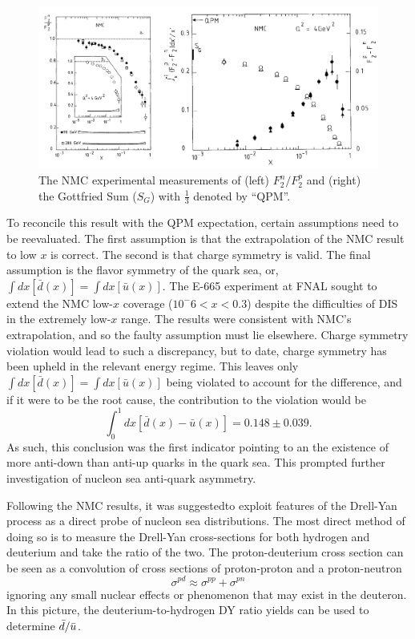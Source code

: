 \begin{figure}[h]
	\centering
	\includegraphics[width=\textwidth]{figures/background/NMC-All.pdf}
	\caption{The NMC experimental measurements of (left) $F_2^n/F_2^p$ and (right) the Gottfried Sum ($S_G$) with $\frac{1}{3}$ denoted by ``QPM''.}
	\label{fig:nmc}
\end{figure}

To reconcile this result with the QPM expectation, certain assumptions need to be reevaluated. The first assumption is that the extrapolation of the NMC result to low $x$ is correct. The second is that charge symmetry is valid. The final assumption is the flavor symmetry of the quark sea, or, $\int dx [\bar{d}(x)] = \int dx [\bar{u}(x)]$. The E-665 experiment at FNAL sought to extend the NMC low-$x$ coverage ($10^-6 < x < 0.3$) despite the difficulties of DIS in the extremely low-$x$ range. The results were consistent with NMC's extrapolation\CN, and so the faulty assumption must lie elsewhere. Charge symmetry violation would lead to such a discrepancy, but to date, charge symmetry has been upheld in the relevant energy regime\cite{Abegg:1998sg}. This leaves only $\int dx [\bar{d}(x)] = \int dx [\bar{u}(x)]$ being violated to account for the difference, and if it were to be the root cause, the contribution to the violation would be
\begin{equation}
\int_0^1 dx[\bar{d}(x) - \bar{u}(x)] = 0.148 \pm 0.039.
\end{equation}
As such, this conclusion was the first indicator pointing to an the existence of more anti-down than anti-up quarks in the quark sea. This prompted further investigation of nucleon sea anti-quark asymmetry.

Following the NMC results, it was suggested\CN to exploit features of the Drell-Yan process as a direct probe of nucleon sea distributions. The most direct method of doing so is to measure the Drell-Yan cross-sections for both hydrogen and deuterium and take the ratio of the two. The proton-deuterium cross section can be seen as a convolution of cross sections of proton-proton and a proton-neutron
\begin{equation}
\sigma^{pd} \approx \sigma^{pp} + \sigma^{pn}
\end{equation}
ignoring any small nuclear effects or phenomenon that may exist in the deuteron. In this picture, the deuterium-to-hydrogen DY ratio yields can be used to determine $\bar{d}/\bar{u}$.

